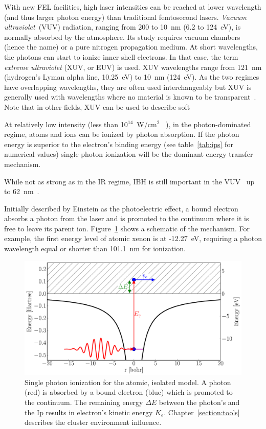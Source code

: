 With new FEL facilities, high laser intensities can be reached at
lower wavelength (and thus larger photon energy) than traditional
femtosecond lasers. \textit{Vacuum ultraviolet}~(VUV) radiation, ranging from 200 to
10~nm (6.2 to 124~eV), is normally absorbed by the atmosphere. Its study
requires vacuum chambers (hence the name) or a pure nitrogen propagation medium.
At short wavelengths, the photons can start to ionize inner shell electrons. In
that case, the term \textit{extreme ultraviolet} (XUV, or EUV) is used. XUV wavelengths
range from 121~nm (hydrogen's Lyman alpha line, 10.25~eV) to 10~nm (124~eV).
As the two regimes have overlapping wavelengths, they are often used
interchangeably but XUV is generally used with wavelengths where no
material is known to be transparent~\cite{Laane2009}. Note that in other fields,
XUV can be used to describe soft \xraysp~\cite{Eichmeier2008,iso21348}

At relatively low intensity (less than 10$^{14}$~W/cm$^2$
~\cite{Ramunno2008}), in the photon-dominated regime, atoms and ions
can be ionized by photon absorption. If the photon energy is superior to the
electron's binding energy (see table~\ref{tab:ips} for numerical values) single
photon ionization will be the dominant energy transfer mechanism.

While not as strong as in the IR regime, IBH is still important in the
VUV~\cite{Krainov2000} up to 62~nm~\cite{Georgescu2007}.



Initially described by Einstein as the photoelectric effect, a bound electron
absorbs a photon from the laser and is promoted to the continuum where it is
free to leave its parent ion. Figure~\ref{fig:ionization:single} shows a
schematic of the mechanism. For example, the first energy level of atomic
xenon is at -12.27~eV, requiring a photon wavelength equal or shorter than
101.1~nm for ionization.


\begin{figure}
 \centering
 \includegraphics[width=\figurewidth]{figures/ionization_single}
 \caption{Single photon ionization for the atomic, isolated model. A photon
          (red) is absorbed by a bound electron (blue) which is promoted to
          the continuum. The remaining energy $\Delta E$ between the photon's
          and the Ip results in electron's kinetic energy $K_e$.
          Chapter~\ref{section:tools} describes the cluster environment
          influence.}
 \label{fig:ionization:single}
\end{figure}

